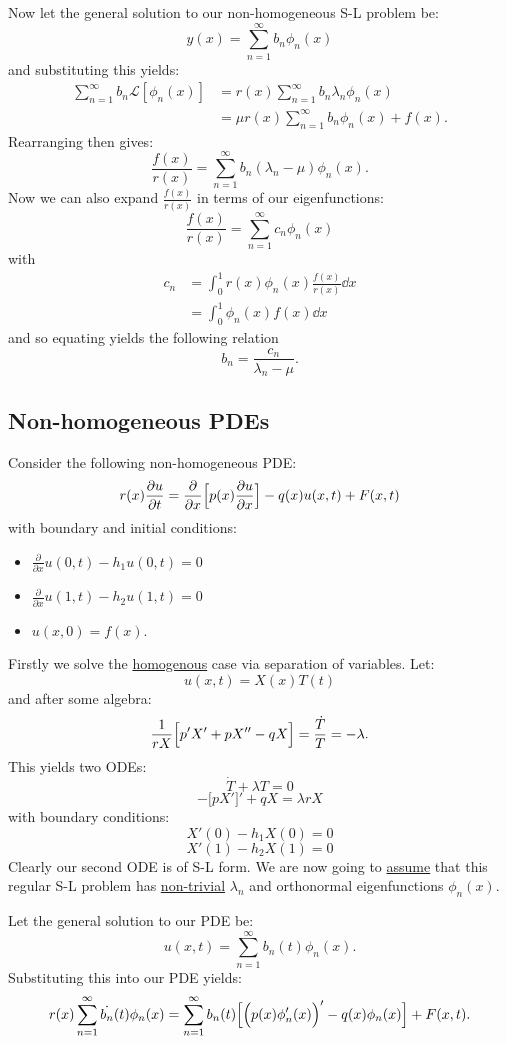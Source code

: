 \documentclass{article}
\begin{document}
Now let the general solution to our non-homogeneous S-L problem be:
$$y(x)=\sum_{n=1}^{\infty} b_n\phi_n(x)$$
and substituting this yields:
\begin{align*}
    \sum_{n=1}^{\infty}b_n\mathcal{L}[\phi_n(x)]
    &=r(x)\sum_{n=1}^{\infty}b_n\lambda_n\phi_n(x) \\
    &=\mu r(x)\sum_{n=1}^{\infty}b_n\phi_n(x)+f(x).
\end{align*}
Rearranging then gives:
$$\frac{f(x)}{r(x)}=\sum_{n=1}^{\infty}
b_n(\lambda_n-\mu)\phi_n(x).$$
Now we can also expand $\displaystyle\frac{f(x)}{r(x)}$
in terms of our eigenfunctions:
$$\frac{f(x)}{r(x)}=\sum_{n=1}^{\infty}c_n\phi_n(x)$$
with
\begin{align*}
    c_n
    &=\int_{0}^{1}r(x)\phi_n(x)
    \frac{f(x)}{r(x)} \dd x \\
    &=\int_{0}^{1}\phi_n(x)f(x)\dd x
\end{align*}
and so equating yields the following relation
$$b_n=\frac{c_n}{\lambda_n-\mu}.$$

\newpage

\subsection{Non-homogeneous PDEs}
Consider the following non-homogeneous PDE:
$$r(x)\frac{\partial u}{\partial t}
=\frac{\partial}{\partial x}\Bigl[
p(x)\frac{\partial u}{\partial x}
\Bigr]-q(x)u(x,t)+F(x,t)$$
with boundary and initial conditions:
\begin{itemize}
    \item $\displaystyle\frac{\partial}{\partial x}
    u(0,t)-h_1 u(0,t)=0$
    \item $\displaystyle\frac{\partial}{\partial x}
    u(1,t)-h_2 u(1,t)=0$
    \item $u(x,0)=f(x)$.
\end{itemize}
Firstly we solve the \underline{homogenous} 
case via separation of variables. Let:
$$u(x,t)=X(x)T(t)$$
and after some algebra:
$$\frac{1}{rX}\Bigl[p'X'+pX''
-qX\Bigr]=\frac{\dot{T}}{T}=-\lambda.$$
This yields two ODEs:
$$\dot{T}+\lambda T=0$$
$$-\bigl[pX'\bigr]'+qX=\lambda rX$$
with boundary conditions:
$$X'(0)-h_1 X(0)=0$$
$$X'(1)-h_2 X(1)=0$$
Clearly our second ODE is of S-L form.
We are now going to \underline{assume} that this
regular S-L problem has \underline{non-trivial} $\lambda_n$
and orthonormal eigenfunctions $\phi_n(x)$.

Let the general solution to our PDE be:
$$u(x,t)=\sum_{n=1}^{\infty}b_n(t)\phi_n(x).$$
Substituting this into our PDE yields:
$$r(x)\sum_{n=1}^{\infty}\dot{b_n}(t)\phi_n(x)
=\sum_{n=1}^{\infty}b_n(t)\Bigl[\Bigl(p(x)
\phi'_n(x)\Bigr)'-q(x)\phi_n(x)\Bigr]+F(x,t).$$
\end{document}
